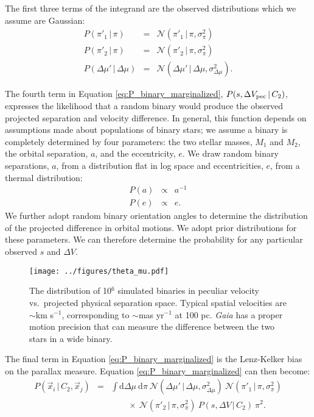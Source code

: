 \documentclass[usenatbib]{mnras}
\newcommand{\given}{\,|\,}
\newcommand{\dd}{\mathrm{d}}
\begin{document}
The first three terms of the integrand are the observed distributions which we assume are Gaussian:
\begin{eqnarray}
P(\pi'_1 \given \pi) &=& \mathcal{N}(\pi'_1 \given \pi, \sigma^2_{\pi}) \\
P(\pi'_2 \given \pi) &=& \mathcal{N}(\pi'_2 \given \pi, \sigma^2_{\pi}) \\
P(\Delta \mu' \given \Delta \mu) &=& \mathcal{N}( \Delta \mu' \given \Delta \mu, \sigma^2_{\Delta \mu} ).
\end{eqnarray}



The fourth term in Equation \ref{eq:P_binary_marginalized}, $P(s, \Delta V_{\rm pec} \given C_2)$, expresses the likelihood that a random binary would produce the observed projected separation and velocity difference. In general, this function depends on assumptions made about populations of binary stars; we assume a binary is completely determined by four parameters: the two stellar masses, $M_1$ and $M_2$, the orbital separation, $a$, and the eccentricity, $e$. We draw random binary separations, $a$, from a distribution flat in log space and eccentricities, $e$, from a thermal distribution:
\begin{eqnarray}
P(a) &\propto& a^{-1} \\
P(e) &\propto& e.
\end{eqnarray}
We further adopt random binary orientation angles to determine the distribution of the projected difference in orbital motions. We adopt prior distributions for these parameters. We can therefore determine the probability for any particular observed $s$ and $\Delta V$.


\begin{figure}
\begin{center}
\texttt{[image: ../figures/theta\_mu.pdf]}
\caption{ The distribution of 10$^6$ simulated binaries in peculiar velocity vs.\ projected physical separation space. Typical spatial velocities are $\sim$km s$^{-1}$, corresponding to $\sim$mas yr$^{-1}$ at 100 pc. {\it Gaia} has a proper motion precision that can measure the difference between the two stars in a wide binary.  }
\label{fig:P_binary}
\end{center}
\end{figure}

The final term in Equation \ref{eq:P_binary_marginalized} is the Lenz-Kelker bias on the parallax measure. Equation \ref{eq:P_binary_marginalized} can then become:
\begin{eqnarray}
P(\vec{x}_i \given C_2, \vec{x}_j) &=& \int \dd \Delta \mu\ \dd \pi\ 
\mathcal{N}( \Delta \mu' \given \Delta \mu, \sigma^2_{\Delta \mu} )\
\mathcal{N}(\pi'_1 \given \pi, \sigma^2_{\pi}) \nonumber \\
& & \qquad \times\ \mathcal{N}(\pi'_2 \given \pi, \sigma^2_{\pi})\
P(s, \Delta V \given C_2)\
\pi^2.
\label{eq:P_binary}
\end{eqnarray}
\end{document}
